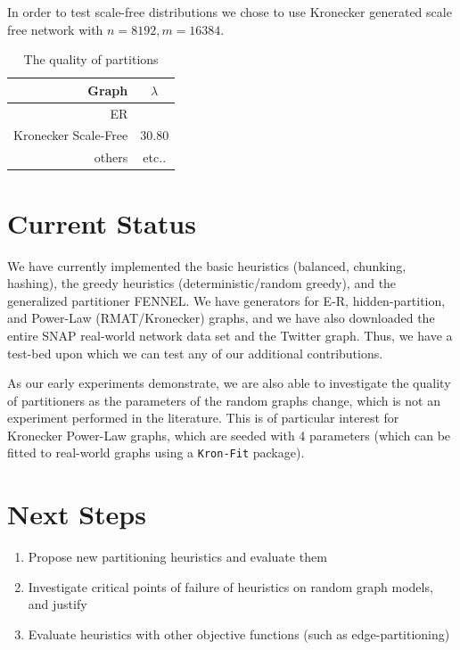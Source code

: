 \documentclass[11pt]{article}
\begin{document}
In order to test scale-free distributions we chose to use Kronecker generated scale free network with $n=8192, m=16384$.

\begin{table}[h]
\centering
\caption{The quality of partitions}
\label{table:quality}
\begin{tabular}{r | c}\hline
Graph & $\lambda$ \\ \hline
ER & \\
Kronecker Scale-Free & 30.80\\
others & etc..\\
\end{tabular}
\end{table}
\newpage
\section{Current Status}
We have currently implemented the basic heuristics (balanced, chunking, hashing), the greedy heuristics (deterministic/random greedy), and the generalized partitioner FENNEL. We have generators for E-R, hidden-partition, and Power-Law (RMAT/Kronecker) graphs, and we have also downloaded the entire SNAP real-world network data set and the Twitter graph. Thus, we have a test-bed upon which we can test any of our additional contributions. 

As our early experiments demonstrate, we are also able to investigate the quality of partitioners as the parameters of the random graphs change, which is not an experiment performed in the literature. This is of particular interest for Kronecker Power-Law graphs, which are seeded with 4 parameters (which can be fitted to real-world graphs using a \texttt{Kron-Fit}  package).

\section{Next Steps}
\begin{enumerate}
\item Propose new partitioning heuristics and evaluate them
\item Investigate critical points of failure of heuristics on random graph models, and justify
\item Evaluate heuristics with other objective functions (such as edge-partitioning)
\end{enumerate}
\end{document}
